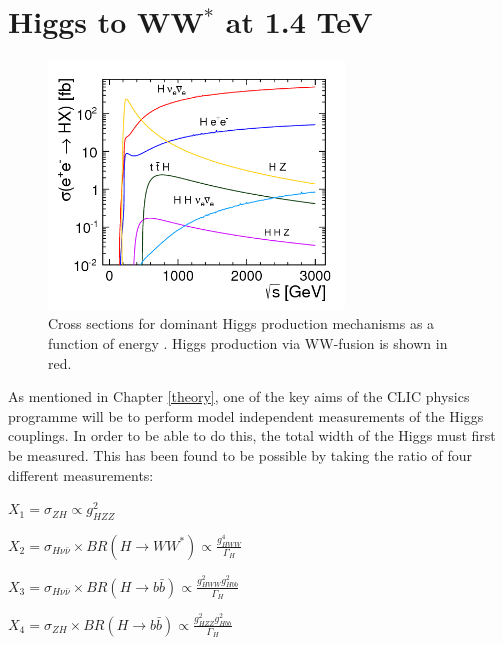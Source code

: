 \chapter{Higgs to WW$^*$ at 1.4 TeV}
\label{Higgs Analysis}

\begin{figure}
  \centering
  \includegraphics[width=0.7\textwidth,keepaspectratio]{Theory/fig/HiggsCrossSections}
  \caption[Cross Sections For Higgs Production Mechanisms]{Cross sections for dominant Higgs production mechanisms as a function of energy \cite{Abramowicz:2016zbo}. Higgs production via WW-fusion is shown in red.}
  \label{fig:higgsXSecs2}
\end{figure}

As mentioned in Chapter \ref{theory}, one of the key aims of the \ac{CLIC} physics programme will be to perform model independent measurements of the Higgs couplings. In order to be able to do this, the total width of the Higgs must first be measured. This has been found to be possible by taking the ratio of four different measurements:


\hspace{120pt}  $X_1=\sigma_{ZH} \propto g_{HZZ}^2$

\hspace{120pt}   $X_2=\sigma_{H\nu\bar{\nu}} \times BR(H\rightarrow WW^*) \propto \frac{g_{HWW}^4}{\Gamma_H}$

\hspace{120pt}   $X_3=\sigma_{H\nu\bar{\nu}} \times BR(H\rightarrow b\bar{b}) \propto \frac{g_{HWW}^{2}g_{Hbb}^2}{\Gamma_H}$

\hspace{120pt}   $X_4=\sigma_{ZH} \times BR(H\rightarrow b\bar{b}) \propto \frac{g_{HZZ}^{2}g_{Hbb}^2}{\Gamma_H}$


